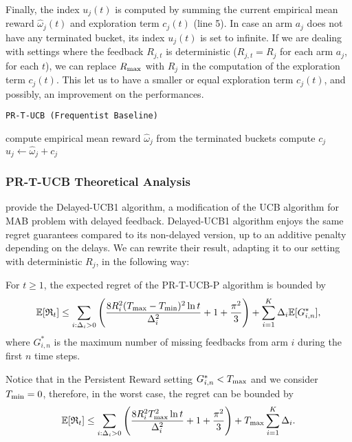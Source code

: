  Finally, the index $u_j(t)$ is computed by summing the current empirical mean reward $\hat{\omega}_j(t) $ and exploration term $c_j(t)$ (line 5). In case an arm $a_j$ does not have any terminated bucket, its index $u_j(t)$ is set to infinite. If we are dealing with settings where the feedback $R_{j,t}$ is deterministic ($R_{j,t}=R_j$ for each arm $a_j$, for each $t$), we can replace $R_{\textnormal{max}}$ with $R_j$ in the computation of the exploration term $c_j(t)$. This let us to have a smaller or equal exploration term $c_j(t)$, and possibly, an improvement on the performances.

\begin{algorithm}[H]
	\caption{\texttt{PR-T-UCB (Frequentist Baseline)}}
	\begin{scriptsize}
		\begin{algorithmic}[1]
			
			\State compute empirical mean reward $\hat{\omega}_j $ from the terminated buckets \;			
			\State compute $c_j$\;
			\State$u_j \gets  \hat{\omega}_j +  c_j$
			\EndFor
			
			\EndFunction
			
		\end{algorithmic}
	\end{scriptsize}
	\label{alg:BaselineUCB}
\end{algorithm}

\subsubsection[]{PR-T-UCB Theoretical Analysis}

\cite{joulani2013} provide the Delayed-UCB1 algorithm, a modification of the UCB algorithm for MAB problem with delayed feedback. Delayed-UCB1 algorithm enjoys the same regret guarantees compared to its non-delayed version, up to an additive penalty depending on the delays. We can rewrite their result, adapting it to our setting with deterministic $R_j$, in the following way:

\begin{theorem}
	For $t \ge 1$, the expected regret of the PR-T-UCB-P algorithm is bounded by
	\[ \mathbb{E}[\mathfrak{R}_t] \le \sum_{i:\Delta_i>0} \Bigg( \frac{8 R_i^2 (T_{\textnormal{max}}-T_{\textnormal{min}})^2\ln t }{\Delta_i^2} + 1 + \frac{\pi^2}{3} \Bigg) + \sum_{i=1}^{K} \Delta_i \mathbb{E}[G^*_{i,n}],\]
	where $G^*_{i,n}$ is the maximum number of missing feedbacks from arm $i$ during the first $n$ time steps.
\end{theorem} 
Notice that in the Persistent Reward setting $G^*_{i,n}<T_{\textnormal{max}}$ and we consider $T_{\textnormal{min}} = 0$, therefore, in the worst case, the regret can be bounded by 
\[ \mathbb{E}[\mathfrak{R}_t] \le \sum_{i:\Delta_i>0} \Bigg( \frac{8 R_i^2 T_{\textnormal{max}}^2\ln t}{\Delta_i^2} + 1 + \frac{\pi^2}{3} \Bigg) + T_{\textnormal{max}}\sum_{i=1}^{K} \Delta_i.\]





